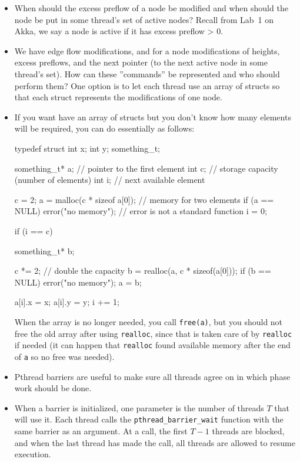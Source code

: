\documentclass{forsete}
\begin{document}
{\begin{itemize}
\item When should the excess preflow of a node 
be modified and when should the node be
	put in some thread's set of active nodes? Recall from Lab~1 on
	Akka, we say a node is active if it has excess preflow > 0.

\item We have edge flow modifications, and for a node modifications
of heights, excess preflows, and
the next pointer (to the next active node in some thread's set).
How can these ''commands'' be represented and who should perform them? 
One option is to let each thread use an array of structs so that
each struct represents the modifications of one node.

\item If you want have an array of structs but you don't know how many elements
will be required, you can do essentially as follows:

\begin{ccode}
typedef struct {
	int	x;
	int	y;
} something_t;

something_t*		a;	// pointer to the first element
int			c;	// storage capacity (number of elements)
int			i;	// next available element

c = 2;
a = malloc(c * sizeof a[0]);	// memory for two elements
if (a == NULL)
	error("no memory");	// error is not a standard function
i = 0;

if (i == c) {
	something_t*	b;

	c *= 2; // double the capacity
	b = realloc(a, c * sizeof(a[0]));
	if (b == NULL)
		error("no memory");
	a = b;
}

a[i].x = x;
a[i].y = y;
i += 1;
\end{ccode}
When the array is no longer needed, you call \verb!free(a)!, but you should not
free the old array after using \verb.realloc., since that is taken care of by
\verb.realloc. if needed (it can happen that \verb.realloc. found available memory
after the end of \verb.a. so no free was needed).

\item Pthread barriers are useful to make sure all threads agree on 
in which phase work should be done. 

\item When a barrier is initialized, one parameter is the number of
threads $T$ that will use it. Each thread calls the
\verb.pthread_barrier_wait. 
function with the same barrier as an 
argument. At a call, the first $T-1$ threads are blocked, and when the last thread has
made the call, all threads are allowed to resume execution.


\end{itemize}}
\end{document}
